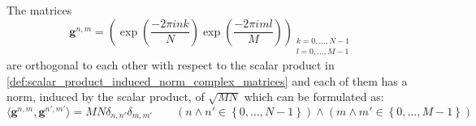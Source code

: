 \begin{Prop}\label{prop:2ddft_matrices_orthogonality}
    The matrices
    \begin{equation}\label{eq:2ddft_matrices}
        \boldsymbol{g}^{n,m} = \left(\exp\left({\frac{-2\pi ink}{N}}\right)\exp\left({\frac{-2\pi iml}{M}}\right)\right)_{\substack{k=0,\ldots,N-1\\l=0,\ldots,M-1}}
    \end{equation}
    are orthogonal to each other with respect to the scalar product in \cref{def:scalar_product_induced_norm_complex_matrices} and 
    each of them has a norm, induced by the scalar product, of $\sqrt{MN}$ which can be formulated as:
    \begin{equation}
        \langle\boldsymbol{g}^{n,m},\boldsymbol{g}^{n',m'}\rangle= MN \delta_{n,n'}\delta_{m,m'} \qquad (n \land n' \in \left\{0,\ldots,N-1\right\}) \land (m \land m' \in \left\{0,\ldots,M-1\right\})
    \end{equation}
\end{Prop}

